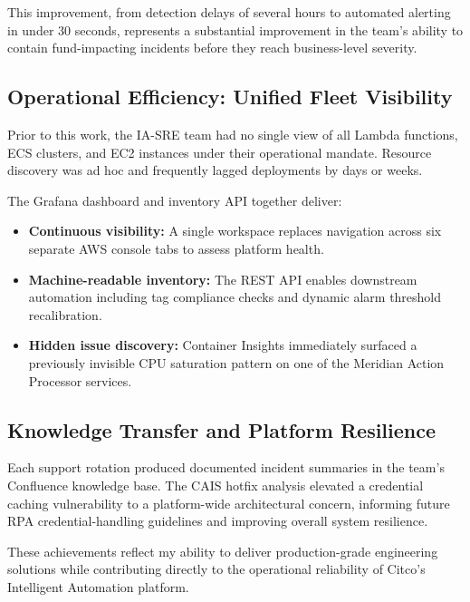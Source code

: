 This improvement, from detection delays of several hours to automated alerting
in under 30 seconds, represents a substantial improvement in the team's ability to contain
fund-impacting incidents before they reach business-level severity.

\subsection{Operational Efficiency: Unified Fleet Visibility}

Prior to this work, the IA-SRE team had no single view of all Lambda functions,
ECS clusters, and EC2 instances under their operational mandate. Resource
discovery was ad hoc and frequently lagged deployments by days or weeks.

The Grafana dashboard and inventory API together deliver:

\begin{itemize}
    \item \textbf{Continuous visibility:} A single workspace replaces navigation
          across six separate AWS console tabs to assess platform health.
    \item \textbf{Machine-readable inventory:} The REST API enables downstream
          automation including tag compliance checks and dynamic alarm
          threshold recalibration.
    \item \textbf{Hidden issue discovery:} Container Insights immediately
          surfaced a previously invisible CPU saturation pattern on one of the
          Meridian Action Processor services.
\end{itemize}

\subsection{Knowledge Transfer and Platform Resilience}

Each support rotation produced documented incident summaries in the team's
Confluence knowledge base. The CAIS hotfix analysis elevated a credential
caching vulnerability to a platform-wide architectural concern, informing
future RPA credential-handling guidelines and improving overall system
resilience.

These achievements reflect my ability to deliver production-grade engineering
solutions while contributing directly to the operational reliability of
Citco's Intelligent Automation platform.

\FloatBarrier
